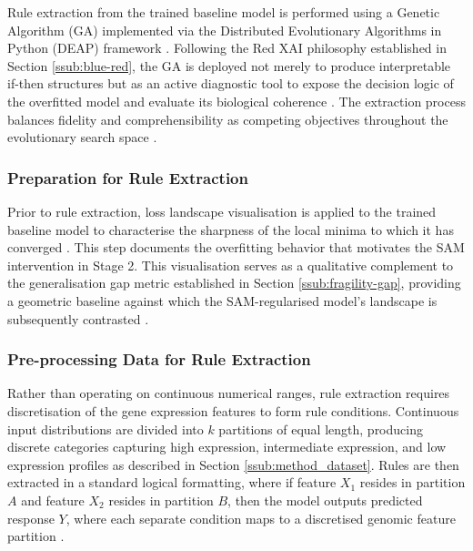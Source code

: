 \label{sub:method_ga}
Rule extraction from the trained baseline model is performed using a Genetic 
Algorithm (GA) implemented via the Distributed Evolutionary Algorithms in Python 
(DEAP) framework \cite{Yedjour2024}. Following the Red XAI philosophy established in 
Section \ref{ssub:blue-red}, the GA is deployed not merely to produce 
interpretable if-then structures but as an active diagnostic tool to expose the 
decision logic of the overfitted model and evaluate its biological coherence 
\cite{Biecek2024}. The extraction process balances fidelity and comprehensibility 
as competing objectives throughout the evolutionary search space \cite{Yedjour2024}.

\subsubsection{Preparation for Rule Extraction}
\label{ssub:method_ga_rule_extraction}
Prior to rule extraction, loss landscape visualisation is applied to the trained 
baseline model to characterise the sharpness of the local minima to which it has 
converged \cite{Li2018}. This step documents the overfitting behavior that 
motivates the SAM intervention in Stage 2. This visualisation serves as a 
qualitative complement to the generalisation gap metric established in Section 
\ref{ssub:fragility-gap}, providing a geometric baseline against which the 
SAM-regularised model's landscape is subsequently contrasted \cite{Li2018}.

\subsubsection{Pre-processing Data for Rule Extraction}
\label{ssub:method_ga_processing}
Rather than operating on continuous numerical ranges, rule extraction requires 
discretisation of the gene expression features to form rule conditions. 
Continuous input distributions are divided into $k$ partitions of equal length, 
producing discrete categories capturing high expression, intermediate expression, 
and low expression profiles as described in Section \ref{ssub:method_dataset}. 
Rules are then extracted in a standard logical formatting, where if feature $X_1$ 
resides in partition $A$ and feature $X_2$ resides in partition $B$, then the 
model outputs predicted response $Y$, where each separate condition maps to a 
discretised genomic feature partition \cite{Yedjour2024}.

